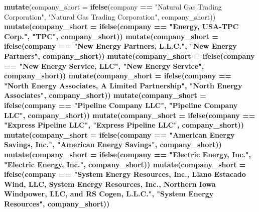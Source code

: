 \documentclass[]{article}
\newenvironment{Shaded}{\begin{snugshade}}{\end{snugshade}}
\newcommand{\KeywordTok}[1]{\textcolor[rgb]{0.13,0.29,0.53}{\textbf{#1}}}
\newcommand{\DataTypeTok}[1]{\textcolor[rgb]{0.13,0.29,0.53}{#1}}
\newcommand{\StringTok}[1]{\textcolor[rgb]{0.31,0.60,0.02}{#1}}
\newcommand{\OperatorTok}[1]{\textcolor[rgb]{0.81,0.36,0.00}{\textbf{#1}}}
\newcommand{\NormalTok}[1]{#1}
\begin{document}
\begin{Shaded}
\begin{Highlighting}[]
{{{{{{{{{{\StringTok{  }\KeywordTok{mutate}\NormalTok{(}\DataTypeTok{company_short =} \KeywordTok{ifelse}\NormalTok{(company }\OperatorTok{==}\StringTok{ "Natural Gas Trading Corporation"}\NormalTok{, }\StringTok{"Natural Gas Trading Corporation"}\NormalTok{, company_short))}\OperatorTok{%
\StringTok{  }\KeywordTok{mutate}\NormalTok{(}\DataTypeTok{company_short =} \KeywordTok{ifelse}\NormalTok{(company }\OperatorTok{==}\StringTok{ "Energy, USA-TPC Corp."}\NormalTok{, }\StringTok{"TPC"}\NormalTok{, company_short))}\OperatorTok{%
\StringTok{  }\KeywordTok{mutate}\NormalTok{(}\DataTypeTok{company_short =} \KeywordTok{ifelse}\NormalTok{(company }\OperatorTok{==}\StringTok{ "New Energy Partners, L.L.C."}\NormalTok{, }\StringTok{"New Energy Partners"}\NormalTok{, company_short))}\OperatorTok{%
\StringTok{  }\KeywordTok{mutate}\NormalTok{(}\DataTypeTok{company_short =} \KeywordTok{ifelse}\NormalTok{(company }\OperatorTok{==}\StringTok{ "New Energy Service, LLC"}\NormalTok{, }\StringTok{"New Energy Service"}\NormalTok{, company_short))}\OperatorTok{%
\StringTok{  }\KeywordTok{mutate}\NormalTok{(}\DataTypeTok{company_short =} \KeywordTok{ifelse}\NormalTok{(company }\OperatorTok{==}\StringTok{ "North Energy Associates, A Limited Partnership"}\NormalTok{, }\StringTok{"North Energy Associates"}\NormalTok{, company_short))}\OperatorTok{%
\StringTok{  }\KeywordTok{mutate}\NormalTok{(}\DataTypeTok{company_short =} \KeywordTok{ifelse}\NormalTok{(company }\OperatorTok{==}\StringTok{ "Pipeline Company LLC"}\NormalTok{, }\StringTok{"Pipeline Company LLC"}\NormalTok{, company_short))}\OperatorTok{%
\StringTok{  }\KeywordTok{mutate}\NormalTok{(}\DataTypeTok{company_short =} \KeywordTok{ifelse}\NormalTok{(company }\OperatorTok{==}\StringTok{ "Express Pipeline LLC"}\NormalTok{, }\StringTok{"Express Pipeline LLC"}\NormalTok{, company_short))}\OperatorTok{%
\StringTok{  }\KeywordTok{mutate}\NormalTok{(}\DataTypeTok{company_short =} \KeywordTok{ifelse}\NormalTok{(company }\OperatorTok{==}\StringTok{ "American Energy Savings, Inc."}\NormalTok{, }\StringTok{"American Energy Savings"}\NormalTok{, company_short))}\OperatorTok{%
\StringTok{  }\KeywordTok{mutate}\NormalTok{(}\DataTypeTok{company_short =} \KeywordTok{ifelse}\NormalTok{(company }\OperatorTok{==}\StringTok{ "Electric Energy, Inc."}\NormalTok{, }\StringTok{"Electric Energy, Inc."}\NormalTok{, company_short))}\OperatorTok{%
\StringTok{  }\KeywordTok{mutate}\NormalTok{(}\DataTypeTok{company_short =} \KeywordTok{ifelse}\NormalTok{(company }\OperatorTok{==}\StringTok{ "System Energy Resources, Inc., Llano Estacado Wind, LLC, System Energy Resources, Inc., Northern Iowa Windpower, LLC, and RS Cogen, L.L.C."}\NormalTok{, }\StringTok{"System Energy Resources"}\NormalTok{, company_short))}\OperatorTok{%
}}}}}}}}}}}}}}}}}}}}
\end{Highlighting}
\end{Shaded}
\end{document}
